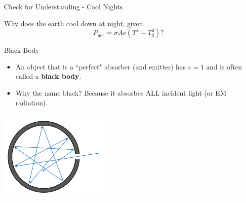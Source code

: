 \documentclass{beamer}
\begin{document}
\begin{frame}{Check for Understanding - Cool Nights}
\begin{center}
   Why does the earth cool down at night, given
   \begin{equation*}
      P_\text{net} = \sigma A e \left(T^4-T_0^4\right)?
   \end{equation*}
\end{center}
\end{frame}

\begin{frame}{Black Body}
\begin{itemize}
   \item An object that is a ``perfect" absorber (and emitter) has $e=1$ and is often called a {\bf black body}.
   \item Why the name black? Because it absorbes ALL incident light (or EM radiation).
\end{itemize}
\begin{center}
   \includegraphics[width=0.40\textwidth]{figures/black_body.png}
\end{center}
\end{frame}
\end{document}

